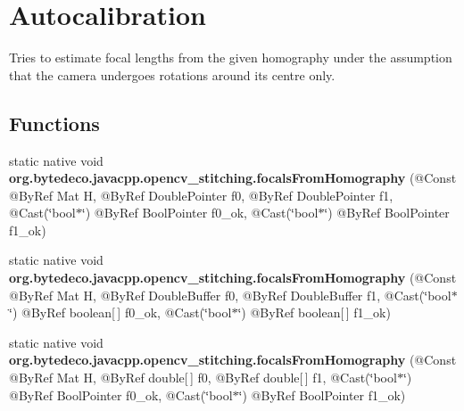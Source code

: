 \hypertarget{group__stitching__autocalib}{}\section{Autocalibration}
\label{group__stitching__autocalib}


Tries to estimate focal lengths from the given homography under the assumption that the camera undergoes rotations around its centre only.  


\subsection*{Functions}
\begin{DoxyCompactItemize}
\item 
\mbox{\label{group__stitching__autocalib_gab90efc34594fe20f1b530021addce56a}} 
static native void {\bfseries org.\+bytedeco.\+javacpp.\+opencv\+\_\+stitching.\+focals\+From\+Homography} (@Const @By\+Ref Mat H, @By\+Ref Double\+Pointer f0, @By\+Ref Double\+Pointer f1, @Cast(\char`\"{}bool$\ast$\char`\"{}) @By\+Ref Bool\+Pointer f0\+\_\+ok, @Cast(\char`\"{}bool$\ast$\char`\"{}) @By\+Ref Bool\+Pointer f1\+\_\+ok)
\item 
\mbox{\label{group__stitching__autocalib_ga8cbc652d8c3dfd07465417fe7f3e1d3d}} 
static native void {\bfseries org.\+bytedeco.\+javacpp.\+opencv\+\_\+stitching.\+focals\+From\+Homography} (@Const @By\+Ref Mat H, @By\+Ref Double\+Buffer f0, @By\+Ref Double\+Buffer f1, @Cast(\char`\"{}bool$\ast$\char`\"{}) @By\+Ref boolean\mbox{[}$\,$\mbox{]} f0\+\_\+ok, @Cast(\char`\"{}bool$\ast$\char`\"{}) @By\+Ref boolean\mbox{[}$\,$\mbox{]} f1\+\_\+ok)
\item 
\mbox{\label{group__stitching__autocalib_ga421256b3f4fc62edb3eb6c66420665df}} 
static native void {\bfseries org.\+bytedeco.\+javacpp.\+opencv\+\_\+stitching.\+focals\+From\+Homography} (@Const @By\+Ref Mat H, @By\+Ref double\mbox{[}$\,$\mbox{]} f0, @By\+Ref double\mbox{[}$\,$\mbox{]} f1, @Cast(\char`\"{}bool$\ast$\char`\"{}) @By\+Ref Bool\+Pointer f0\+\_\+ok, @Cast(\char`\"{}bool$\ast$\char`\"{}) @By\+Ref Bool\+Pointer f1\+\_\+ok)
\item 
\mbox{\label{group__stitching__autocalib_ga9a0b4e0ddd6f3f182e6d80ef5fa18c42}} 

\end{DoxyCompactItemize}
